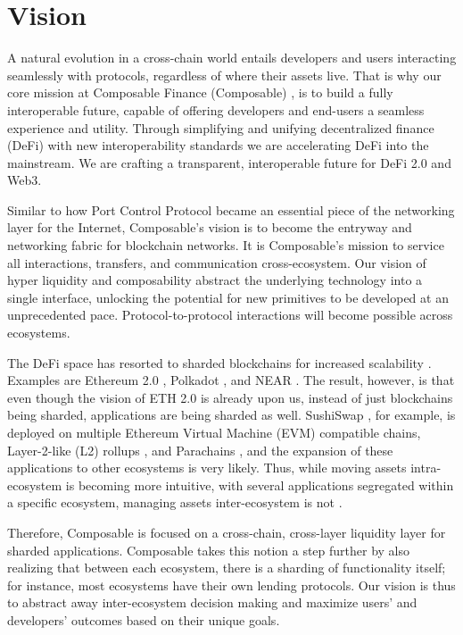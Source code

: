 \section{Vision\label{sec:vision}}

A natural evolution in a cross-chain world entails developers and users interacting seamlessly with protocols, regardless of where their assets live. That is why our core mission at Composable Finance (Composable) \cite{ComposableFinance}, is to build a fully interoperable future, capable of offering developers and end-users a seamless experience and utility.
%
Through simplifying and unifying decentralized finance (DeFi) \cite{DecentralizedEthereum.org} with new interoperability standards we are accelerating DeFi into the mainstream. We are crafting a transparent, interoperable future for DeFi 2.0 and Web3.

Similar to how Port Control Protocol \cite{PortWikipedia} became an essential piece of the networking layer for the Internet, Composable's vision is to become the entryway and networking fabric for blockchain networks. It is Composable's mission to service all interactions, transfers, and communication cross-ecosystem.
%
Our vision of hyper liquidity and composability abstract the underlying technology into a single interface, unlocking the potential for new primitives to be developed at an unprecedented pace. Protocol-to-protocol interactions will become possible across ecosystems.

The DeFi space has resorted to sharded blockchains for increased scalability \cite{WhyProperties,WhatCoinDesk}. Examples are Ethereum 2.0 \cite{TheEthereum.org}, Polkadot \cite{Polkadot:Platform}, and NEAR \cite{NEARWorld}. The result, however, is that even though the vision of ETH 2.0 is already upon us, instead of just blockchains being sharded, applications are being sharded as well. SushiSwap \cite{IntroductionSushi}, for example, is deployed on multiple Ethereum Virtual Machine (EVM) \cite{EthereumEthereum.org} compatible chains, Layer-2-like (L2) rollups \cite{LayerEthereum.org}, and Parachains \cite{WhatAlexandria}, and the expansion of these applications to other ecosystems is very likely. Thus, while moving assets intra-ecosystem is becoming more intuitive, with several applications segregated within a specific ecosystem, managing assets inter-ecosystem is not \cite{0xbrainjarOurMedium}.

Therefore, Composable is focused on a cross-chain, cross-layer liquidity layer for sharded applications. Composable takes this notion a step further by also realizing that between each ecosystem, there is a sharding of functionality itself; for instance, most ecosystems have their own lending protocols. Our vision is thus to abstract away inter-ecosystem decision making and maximize users' and developers' outcomes based on their unique goals.

